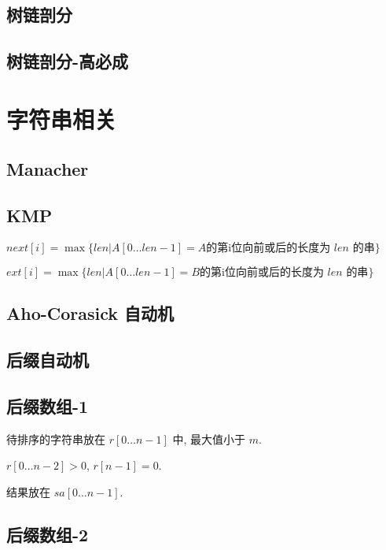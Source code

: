 \documentclass[landscape, twocolumn, 8pt, a4paper, twoside]{extarticle}
\begin{document}
\subsection{树链剖分}


\subsection{树链剖分-高必成}


\section{字符串相关}
\subsection{Manacher}


\subsection{KMP}
$next[i] = \max\{len | A[0 \ldots len - 1] = A \textrm{的第i位向前或后的长度为 $len$ 的串} \}$

$ext[i] = \max\{len | A[0 \ldots len - 1] = B \textrm{的第i位向前或后的长度为 $len$ 的串} \}$


\subsection{Aho-Corasick 自动机}


\subsection{后缀自动机}


\subsection{后缀数组-1}
待排序的字符串放在 $r[0 \ldots n - 1]$ 中, 最大值小于 $m$.

$r[0 \ldots n - 2] > 0$, $r[n - 1] = 0$.

结果放在 $sa[0 \ldots n - 1]$.


\subsection{后缀数组-2}

\end{document}

